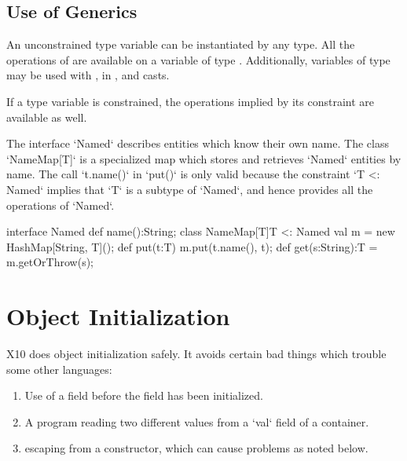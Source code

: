 \subsection{Use of Generics}

An unconstrained type variable  can be instantiated by any type. All
the operations of  are available on a 
variable of type . Additionally, variables of type
 may be used with \Xcd{==, !=}, in , and casts.  

If a type variable is constrained, the operations implied by its constraint
are available as well.

\begin{ex}
The interface \xcd`Named` describes entities which know their own name.  The
class \xcd`NameMap[T]` is a specialized map which stores and retrieves
\xcd`Named` entities by name.  The call \xcd`t.name()` in \xcd`put()` is only
valid because the constraint \xcd`{T <: Named}` implies that \xcd`T` is a
subtype of \xcd`Named`, and hence provides all the operations of \xcd`Named`. 
\begin{xten}
interface Named { def name():String; }
class NameMap[T]{T <: Named} {
   val m = new HashMap[String, T]();
   def put(t:T) { m.put(t.name(), t); }
   def get(s:String):T = m.getOrThrow(s);
}
\end{xten}
%


\end{ex}





\section{Object Initialization}
\label{ObjectInitialization}


X10 does object initialization safely.  It avoids certain bad things which
trouble some other languages:
\begin{enumerate}
\item Use of a field before the field has been initialized.
\item A program reading two different values from a \xcd`val` field of a
      container. 
\item {} escaping from a constructor, which can cause problems as
      noted below. 

\end{enumerate}

